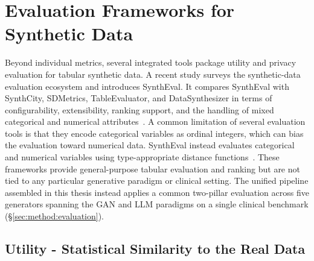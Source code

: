 \section{Evaluation Frameworks for Synthetic Data}
\label{sec:bg:eval}


Beyond individual metrics, several integrated tools package utility and privacy
evaluation for tabular synthetic data. A recent study surveys the 
synthetic-data evaluation ecosystem and
introduces SynthEval. It compares SynthEval with SynthCity, SDMetrics,
TableEvaluator, and DataSynthesizer in terms of configurability,
extensibility, ranking support, and the handling of mixed categorical and
numerical attributes~\cite{lautrup2025syntheval}. A common limitation 
of several evaluation tools is that they encode
categorical variables as ordinal integers, which can bias the evaluation
toward numerical data. SynthEval instead evaluates categorical and
numerical variables using type-appropriate distance
functions~\cite{lautrup2025syntheval}. These 
frameworks provide general-purpose tabular evaluation and ranking but are not 
tied to any particular generative paradigm or clinical setting. The
unified pipeline assembled in this thesis instead applies a common two-pillar
evaluation across five generators spanning the GAN and LLM paradigms on a single
clinical benchmark (\S\ref{sec:method:evaluation}).

\subsection{Utility - Statistical Similarity to the Real Data}
\label{sec:bg:eval:similarity}


